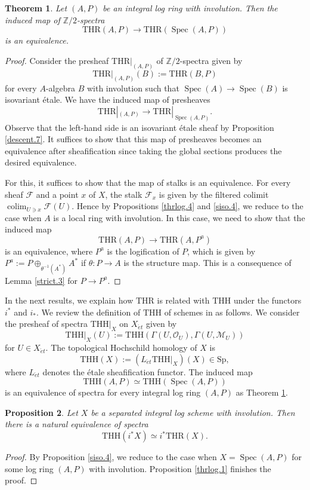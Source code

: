 \documentclass[10pt]{amsart}
\newtheorem{thm}{Theorem}[section]
\newtheorem{prop}[thm]{Proposition}
\theoremstyle{definition}
\theoremstyle{remark}
\numberwithin{equation}{section}
\newcommand{\Z}{\mathbb{Z}}
\newcommand{\cF}{\mathcal{F}}
\newcommand{\cM}{\mathcal{M}}
\newcommand{\cO}{\mathcal{O}}
\newcommand{\et}{{\acute{e}t}}
\DeclareMathOperator{\Spec}{Spec}
\newcommand{\colim}{\mathop{\mathrm{colim}}}
\newcommand{\Sp}{\mathrm{Sp}}
\newcommand{\THH}{\mathrm{THH}}
\newcommand{\THR}{\mathrm{THR}}
\begin{document}
\begin{thm}
\label{descent.5}
Let $(A,P)$ be an integral log ring with involution.
Then the induced map of $\Z/2$-spectra
\[
\THR(A,P)
\to
\THR(\Spec(A,P))
\]
is an equivalence.
\end{thm}
\begin{proof}
Consider the presheaf $\THR|_{(A,P)}$ of $\Z/2$-spectra given by
\[
\THR|_{(A,P)}(B):= \THR(B,P)
\]
for every $A$-algebra $B$ with involution such that $\Spec(A)\to \Spec(B)$ is isovariant \'etale.
We have the induced map of presheaves
\[
\THR|_{(A,P)}
\to
\THR|_{\Spec(A,P)}.
\]
Observe that the left-hand side is an isovariant \'etale sheaf by Proposition \ref{descent.7}.
It suffices to show that this map of presheaves becomes an equivalence after sheafification
since taking the global sections produces the desired equivalence.

For this,
it suffices to show that the map of stalks is an equivalence.
For every sheaf $\cF$ and a point $x$ of $X$,
the stalk $\cF_x$ is given by the filtered colimit $\colim_{U\ni x}\cF(U)$.
Hence by Propositions \ref{thrlog.4} and \ref{siso.4},
we reduce to the case when $A$ is a local ring with involution.
In this case,
we need to show that the induced map
\[
\THR(A,P)
\to
\THR(A,P^a)
\]
is an equivalence,
where $P^a$ is the logification of $P$,
which is given by $P^a:=P\oplus_{\theta^{-1}(A^*)}A^*$ if $\theta\colon P\to A$ is the structure map.
This is a consequence of Lemma \ref{strict.3} for $P\to P^a$.
\end{proof}














In the next results,
we explain how $\THR$ is related with $\THH$ under the functors $i^*$ and $i_*$.
We review the definition of $\THH$ of schemes in \cite[Definition 8.3.7]{logSH} as follows.
We consider the presheaf of spectra
$\THH|_X$ on $X_{\et}$ given by
\[
\THH|_X(U):=\THH(\Gamma(U,\cO_U),\Gamma(U,\cM_U))
\]
for $U\in X_{\et}$.
The topological Hochschild homology of $X$ is
\[
\THH(X):=
(L_{\et}\THH|_X)(X)\in \Sp,
\]
where $L_{\et}$ denotes the \'etale sheafification functor.
The induced map
\[
\THH(A,P)
\simeq
\THH(\Spec(A,P))
\]
is an equivalence of spectra for every integral log ring $(A,P)$ as Theorem \ref{descent.5}.

\begin{prop}
\label{siso.7}
Let $X$ be a separated integral log scheme with involution.
Then there is a natural equivalence of spectra
\[
\THH(i^*X)
\simeq
i^*\THR(X).
\]
\end{prop}
\begin{proof}
By Proposition \ref{siso.4},
we reduce to the case when $X=\Spec(A,P)$ for some log ring $(A,P)$ with involution.
Proposition \ref{thrlog.1} finishes the proof.
\end{proof}
\end{document}
